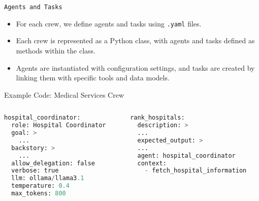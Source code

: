 \begin{frame}[fragile]{\texttt{Agents and Tasks}}
    \begin{itemize}
        \item For each crew, we define agents and tasks using \texttt{.yaml} files.
        \item Each crew is represented as a Python class, with agents and tasks defined as methods within the class.
        \item Agents are instantiated with configuration settings, and tasks are created by linking them with specific tools and data models.
    \end{itemize}
    \Large \color{red}Example Code: Medical Services Crew \color{black}
      \begin{columns}
        \begin{column}{0.48\textwidth} %
            \centering
            \begin{lstlisting}[language=Python, breaklines=true]
hospital_coordinator:
  role: Hospital Coordinator
  goal: >
    ...
  backstory: >
    ...
  allow_delegation: false
  verbose: true
  llm: ollama/llama3.1
  temperature: 0.4
  max_tokens: 800

            \end{lstlisting}
        \end{column}
        \begin{column}{0.48\textwidth} %
            \centering
            \begin{lstlisting}[language=Python, breaklines=true]
rank_hospitals:
  description: >
  ...
  expected_output: >
  ...
  agent: hospital_coordinator
  context:
    - fetch_hospital_information
            \end{lstlisting}
        \end{column}
      \end{columns}
\end{frame}